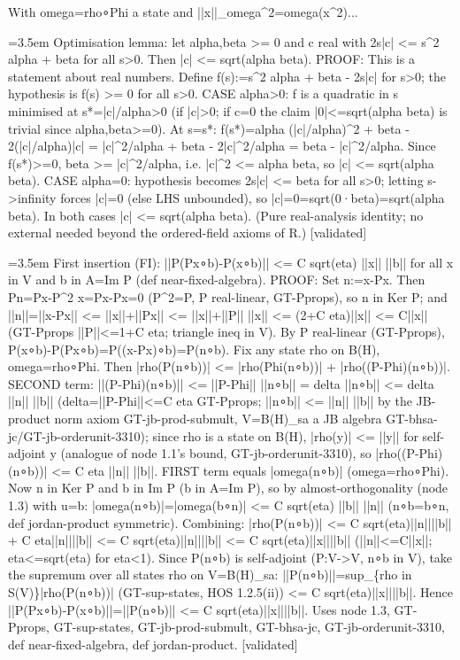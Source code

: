 \documentclass{article}
\newcommand{\step}[1]{\par\noindent\hangindent=3.5em\hangafter=1%
  \makebox[3.5em][l]{\textbf{#1.}}}
\newcommand{\steptag}[1]{\hfill{\small\textsf{[#1]}}}
\begin{document}
\begin{proofbox}{With omega=rho∘Phi a state and ||x||\_omega\textasciicircum{}2=omega(x\textasciicircum{}2)...}
\step{1.3.1} Optimisation lemma: let alpha,beta >= 0 and c real with 2s|c| <= s\textasciicircum{}2 alpha + beta for all s>0. Then |c| <= sqrt(alpha beta). PROOF: This is a statement about real numbers. Define f(s):=s\textasciicircum{}2 alpha + beta - 2s|c| for s>0; the hypothesis is f(s) >= 0 for all s>0. CASE alpha>0: f is a quadratic in s minimised at s*=|c|/alpha>0 (if |c|>0; if c=0 the claim |0|<=sqrt(alpha beta) is trivial since alpha,beta>=0). At s=s*: f(s*)=alpha (|c|/alpha)\textasciicircum{}2 + beta - 2(|c|/alpha)|c| = |c|\textasciicircum{}2/alpha + beta - 2|c|\textasciicircum{}2/alpha = beta - |c|\textasciicircum{}2/alpha. Since f(s*)>=0, beta >= |c|\textasciicircum{}2/alpha, i.e. |c|\textasciicircum{}2 <= alpha beta, so |c| <= sqrt(alpha beta). CASE alpha=0: hypothesis becomes 2s|c| <= beta for all s>0; letting s->infinity forces |c|=0 (else LHS unbounded), so |c|=0=sqrt(0·beta)=sqrt(alpha beta). In both cases |c| <= sqrt(alpha beta). (Pure real-analysis identity; no external needed beyond the ordered-field axioms of R.) \steptag{validated} \\[4pt]
\step{1.4} First insertion (FI): ||P(Px∘b)-P(x∘b)|| <= C sqrt(eta) ||x|| ||b|| for all x in V and b in A=Im P (def near-fixed-algebra). PROOF: Set n:=x-Px. Then Pn=Px-P\textasciicircum{}2 x=Px-Px=0 (P\textasciicircum{}2=P, P real-linear, GT-Pprops), so n in Ker P; and ||n||=||x-Px|| <= ||x||+||Px|| <= ||x||+||P|| ||x|| <= (2+C eta)||x|| <= C||x|| (GT-Pprops ||P||<=1+C eta; triangle ineq in V). By P real-linear (GT-Pprops), P(x∘b)-P(Px∘b)=P((x-Px)∘b)=P(n∘b). Fix any state rho on B(H), omega=rho∘Phi. Then |rho(P(n∘b))| <= |rho(Phi(n∘b))| + |rho((P-Phi)(n∘b))|. SECOND term: ||(P-Phi)(n∘b)|| <= ||P-Phi|| ||n∘b|| = delta ||n∘b|| <= delta ||n|| ||b|| (delta=||P-Phi||<=C eta GT-Pprops; ||n∘b|| <= ||n|| ||b|| by the JB-product norm axiom GT-jb-prod-submult, V=B(H)\_sa a JB algebra GT-bhsa-jc/GT-jb-orderunit-3310); since rho is a state on B(H), |rho(y)| <= ||y|| for self-adjoint y (analogue of node 1.1's bound, GT-jb-orderunit-3310), so |rho((P-Phi)(n∘b))| <= C eta ||n|| ||b||. FIRST term equals |omega(n∘b)| (omega=rho∘Phi). Now n in Ker P and b in Im P (b in A=Im P), so by almost-orthogonality (node 1.3) with u=b: |omega(n∘b)|=|omega(b∘n)| <= C sqrt(eta) ||b|| ||n|| (n∘b=b∘n, def jordan-product symmetric). Combining: |rho(P(n∘b))| <= C sqrt(eta)||n||||b|| + C eta||n||||b|| <= C sqrt(eta)||n||||b|| <= C sqrt(eta)||x||||b|| (||n||<=C||x||; eta<=sqrt(eta) for eta<1). Since P(n∘b) is self-adjoint (P:V->V, n∘b in V), take the supremum over all states rho on V=B(H)\_sa: ||P(n∘b)||=sup\_\{rho in S(V)\}|rho(P(n∘b))| (GT-sup-states, HOS 1.2.5(ii)) <= C sqrt(eta)||x||||b||. Hence ||P(Px∘b)-P(x∘b)||=||P(n∘b)|| <= C sqrt(eta)||x||||b||. Uses node 1.3, GT-Pprops, GT-sup-states, GT-jb-prod-submult, GT-bhsa-jc, GT-jb-orderunit-3310, def near-fixed-algebra, def jordan-product. \steptag{validated} \\[4pt]
\end{proofbox}
\end{document}

